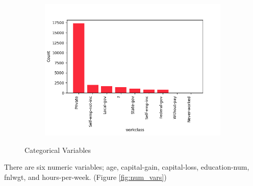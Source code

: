 \documentclass{article}
\begin{document}
\begin{figure}[H]
\begin{subfigure}{0.3\textwidth}
        \includegraphics[width=\linewidth,]{img/workclass.png}
    \end{subfigure}

    \caption{Categorical Variables}
    \label{fig:cat_vars}
\end{figure}

There are six numeric variables; age, capital-gain, capital-loss, education-num, fnlwgt, and hours-per-week. (Figure \ref{fig:num_vars})
\end{document}
